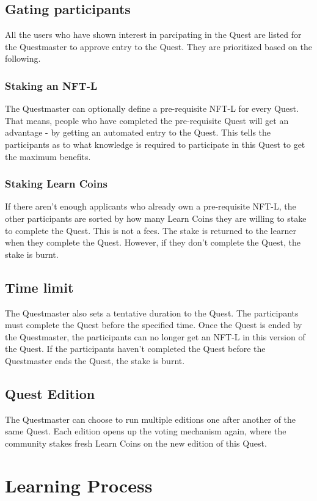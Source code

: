 \documentclass{article}
\begin{document}
    \subsection{Gating participants}
      All the users who have shown interest in parcipating in the Quest are listed for the Questmaster to approve entry to the Quest. They are prioritized based on the following.
      \subsubsection{Staking an NFT-L}
        The Questmaster can optionally define a pre-requisite NFT-L for every Quest. That means, people who have completed the pre-requisite Quest will get an advantage - by getting an automated entry to the Quest.
        This tells the participants as to what knowledge is required to participate in this Quest to get the maximum benefits. 
      \subsubsection{Staking Learn Coins}
        If there aren't enough applicants who already own a pre-requisite NFT-L, the other participants are sorted by how many Learn Coins they are willing to stake to complete the Quest. This is not a fees. The stake is returned to the learner when they complete the Quest. However, if they don't complete the Quest, the stake is burnt.
    \subsection{Time limit}
      The Questmaster also sets a tentative duration to the Quest. The participants must complete the Quest before the specified time. 
      Once the Quest is ended by the Questmaster, the participants can no longer get an NFT-L in this version of the Quest. If the participants haven't completed the Quest before the Questmaster ends the Quest, the stake is burnt.
    \subsection{Quest Edition}
      The Questmaster can choose to run multiple editions one after another of the same Quest. Each edition opens up the voting mechanism again, where the community stakes fresh Learn Coins on the new edition of this Quest. 
  \section{Learning Process}
\end{document}
